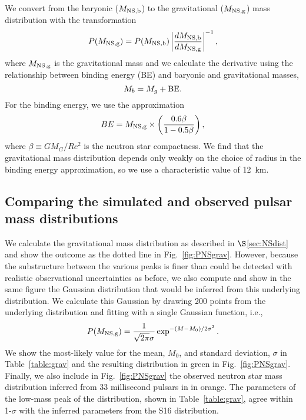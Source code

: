 \documentclass[]{emulateapj}
\newcommand{\Mnb}{M_{\rm NS, b}}
\newcommand{\Mng}{M_{\rm NS, g}}
\begin{document}
We convert from the baryonic ($\Mnb$) to the gravitational ($\Mng$) mass distribution with the transformation
\begin{equation}
P(\Mng) = P(\Mnb) \left| \frac{d \Mnb}{d \Mng} \right| ^{-1},
\end{equation}
where $\Mng$ is the gravitational mass and we calculate the derivative using the relationship between binding energy (BE) and baryonic and gravitational masses,
\begin{equation}
M_{b} = M_{g} + \rm BE.
\end{equation}
For the binding energy, we use the \citet{Lattimer2001} approximation
\begin{equation}
BE = \Mng \times \left( \frac{0.6 \beta}{1- 0.5\beta} \right),
\end{equation}
where $\beta \equiv G M_G / R c^2$ is the neutron star compactness. We find that the gravitational mass distribution depends only weakly on the choice of radius in the binding energy approximation, so we use a characteristic value of 12~km. 

\subsection{Comparing the simulated and observed pulsar mass distributions}
We calculate the gravitational mass distribution as described in $\S$\ref{sec:NSdist} and show the outcome as the dotted line in Fig.~\ref{fig:PNSgrav}. However, because the substructure between the various peaks is finer than could be detected with realistic observational uncertainties as before, we also compute and show in the same figure the Gaussian distribution that would be inferred from this underlying distribution. We calculate this Gaussian by drawing 200 points from the underlying distribution and fitting with a single Gaussian function, i.e.,
\begin{equation}
P(\Mng) = \frac{1}{\sqrt{2\pi}\sigma}\exp^{-(M-M_0)/2\sigma^2}.
\end{equation}
We show the most-likely value for the mean, $M_0$, and standard deviation, $\sigma$ in Table~\ref{table:grav} and the resulting distribution in green in Fig.~\ref{fig:PNSgrav}. Finally, we also include in Fig.~\ref{fig:PNSgrav} the observed neutron star mass distribution inferred from 33 millisecond pulsars in \citet{Antoniadis2016} in orange. The parameters of the low-mass peak of the \citet{Antoniadis2016} distribution, shown in Table~\ref{table:grav}, agree within 1-$\sigma$ with the inferred parameters from the S16 distribution.
\end{document}
